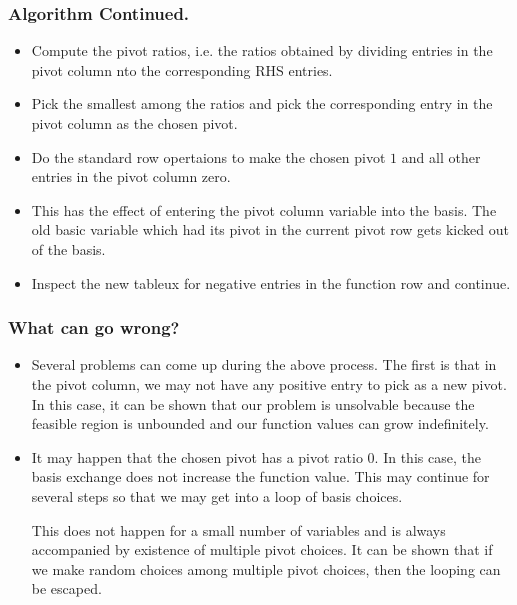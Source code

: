 \begin{frame}%
  \frametitle{Algorithm Continued.}
  \begin{itemize}%
\item Compute the pivot ratios, i.e. the ratios obtained by dividing
 entries in the pivot column nto the corresponding RHS
entries.

\item Pick the smallest among the ratios and pick the corresponding
entry in the pivot column as the chosen pivot.

\item Do the standard row opertaions to make the chosen pivot $1$ and
all other entries in the pivot column zero.
\item This has the effect of entering the pivot column variable into the
basis. The old basic variable which had its pivot in the current pivot
row gets kicked out of the basis.

\item Inspect the new tableux for negative entries in the function row
and continue.

\end{itemize}
\end{frame}
\begin{frame}%
  \frametitle{What can go wrong?}
  \begin{itemize}%
\item {}
Several problems can come up during the above process.
The first is that in the pivot column, we may not have any positive
entry to pick as a new pivot. In this case, it can be shown that our
problem is unsolvable because the feasible region is unbounded and our
function values can grow indefinitely.

\item It may happen that the chosen pivot has a pivot ratio $0$. In this
case, the basis exchange does not increase the function value. This may
continue for several steps so that we may get into a loop of basis
choices.

This does not happen for a small number of variables and is always
accompanied by existence of multiple pivot choices. It can be shown that
if we make random choices among multiple pivot choices, then the looping
can be escaped.



\end{itemize}
\end{frame}

